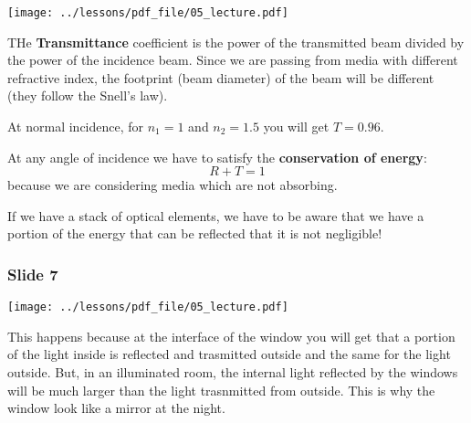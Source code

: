 \documentclass[../main/main.tex]{subfiles}
\begin{document}
\begin{minipage}[]{0.5\linewidth}
\centering
\texttt{[image: ../lessons/pdf\_file/05\_lecture.pdf]}
\end{minipage}
\hspace{0.3cm}\vspace{0.3cm}
\begin{minipage}[c]{0.47\linewidth}

THe \textbf{Transmittance} coefficient is the power of the transmitted beam divided by the power of  the incidence beam. Since we are passing from media with different refractive index, the footprint (beam diameter) of the beam will be different (they follow the Snell's law).

At normal incidence, for \( n_1 =1 \) and \( n_2 =1.5 \) you will get \( T=0.96 \).

At any angle of incidence we have to satisfy the \textbf{conservation of energy}:
\begin{equation*}
  R + T = 1
\end{equation*}
because we are considering media which are not absorbing.

If we have a stack of optical elements, we have to be aware that we have a portion of the energy that can be reflected that it is not negligible!

\end{minipage}

\newpage

\subsubsection*{Slide 7}

\begin{minipage}[]{0.5\linewidth}
\centering
\texttt{[image: ../lessons/pdf\_file/05\_lecture.pdf]}
\end{minipage}
\hspace{0.3cm}\vspace{0.3cm}
\begin{minipage}[c]{0.47\linewidth}

This happens because at the interface of the window you will get that a portion of the light inside is reflected and trasmitted outside and the same for the light outside. But, in an illuminated room, the internal light reflected by the windows will be much larger than the light trasnmitted from outside. This is why the window look like a mirror at the night.

\end{minipage}
\end{document}

